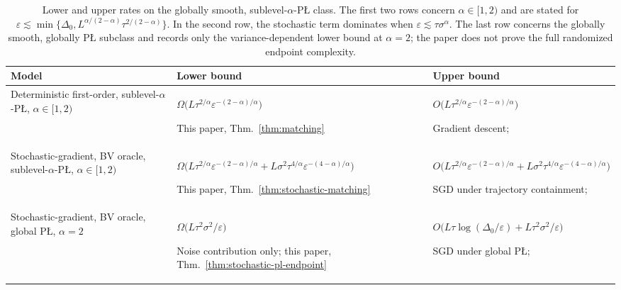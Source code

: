 \documentclass[11pt]{article}
\begin{document}
\begin{table}[t]
\centering
\small
\begin{tabular}{@{}
>{\raggedright\arraybackslash}p{}
>{\raggedright\arraybackslash}p{}
>{\raggedright\arraybackslash}p{}
@{}}
\toprule
Model & Lower bound & Upper bound \\
\midrule
Deterministic first-order, sublevel-$\alpha$-P\L{}, $\alpha\in[1,2)$
&
{\boldmath$\Omega\bigl(L\tau^{2/\alpha}\varepsilon^{-(2-\alpha)/\alpha}\bigr)$}
\par\smallskip
{\small This paper, Thm.~\ref{thm:matching}}
&
$O\bigl(L\tau^{2/\alpha}\varepsilon^{-(2-\alpha)/\alpha}\bigr)$
\par\smallskip
{\small Gradient descent; \citet{AttouchBolteRedontSoubeyran2010}}
\\
\addlinespace[0.5em]
Stochastic-gradient, BV oracle, sublevel-$\alpha$-P\L{}, $\alpha\in[1,2)$
&
{\boldmath$\Omega\bigl(L\tau^{2/\alpha}\varepsilon^{-(2-\alpha)/\alpha}
 + L\sigma^2\tau^{4/\alpha}\varepsilon^{-(4-\alpha)/\alpha}\bigr)$}
\par\smallskip
{\small This paper, Thm.~\ref{thm:stochastic-matching}}
&
$O\bigl(L\tau^{2/\alpha}\varepsilon^{-(2-\alpha)/\alpha}
 + L\sigma^2\tau^{4/\alpha}\varepsilon^{-(4-\alpha)/\alpha}\bigr)$
\par\smallskip
{\small SGD under trajectory containment; \citet{FatkhullinEtesamiHeKiyavash2022}}
\\
\addlinespace[0.5em]
Stochastic-gradient, BV oracle, global P\L{}, $\alpha=2$
&
\boldmath$\Omega\bigl(L\tau^2\sigma^2/\varepsilon\bigr)$
\par\smallskip
\small Noise contribution only; this paper, Thm.~\ref{thm:stochastic-pl-endpoint}
&
$O\bigl(L\tau\log(\Delta_0/\varepsilon)+L\tau^2\sigma^2/\varepsilon\bigr)$
\par\smallskip
\small SGD under global P\L{}; \citet{FatkhullinEtesamiHeKiyavash2022}
\\
\bottomrule
\end{tabular}
\caption{Lower and upper rates on the globally smooth, sublevel-$\alpha$-P\L{} class. The first two
rows concern $\alpha\in[1,2)$ and are stated for
\(\varepsilon\lesssim\min\{\Delta_0,L^{\alpha/(2-\alpha)}\tau^{2/(2-\alpha)}\}\). In the second row, the stochastic
term dominates when \(\varepsilon\lesssim\tau\sigma^\alpha\). The last row concerns the globally
smooth, globally P\L{} subclass and records only the variance-dependent lower bound at $\alpha=2$; the paper does not
prove the full randomized endpoint complexity.}
\label{tab:complexity-summary}
\end{table}
\end{document}
